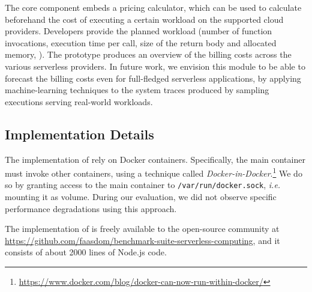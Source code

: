 The core component embeds a pricing calculator, which can be used to calculate beforehand the cost of executing a certain workload on the supported cloud providers. 
Developers provide the planned workload (\eg number of function invocations, execution time per call, size of the return body and allocated memory, \etc).
The \sys prototype produces an overview of the billing costs across the various serverless providers.
In future work, we envision this module to be able to forecast the billing costs even for full-fledged serverless applications, by applying machine-learning techniques to the system traces produced by sampling executions serving real-world workloads.

\subsection{Implementation Details}\label{ssec:impl}
The implementation of \sys rely on Docker containers.
Specifically, the main container must invoke other containers, using a technique called \emph{Docker-in-Docker}.\footnote{\url{https://www.docker.com/blog/docker-can-now-run-within-docker/}}
We do so by granting access to the main container to \texttt{/var/run/docker.sock}, \emph{i.e.} mounting it as volume.
During our evaluation, we did not observe specific performance degradations using this approach.

The implementation of \sys is freely available to the open-source community at \url{https://github.com/faasdom/benchmark-suite-serverless-computing}, and it consists of about 2000 lines of Node.js code.